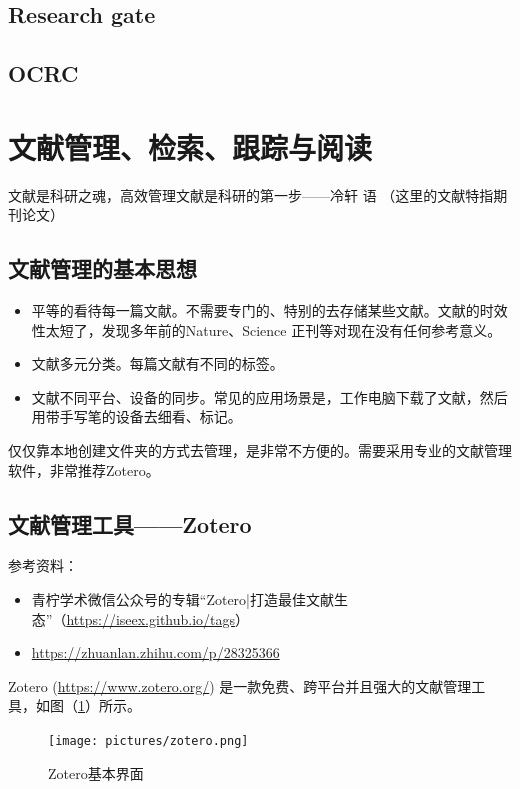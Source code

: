 \subsection{Research gate}


\subsection{OCRC}




\section{文献管理、检索、跟踪与阅读}
文献是科研之魂，高效管理文献是科研的第一步——冷轩 \quad 语 （这里的文献特指期刊论文）



\subsection{文献管理的基本思想}
\begin{itemize}
\item 平等的看待每一篇文献。不需要专门的、特别的去存储某些文献。文献的时效性太短了，发现多年前的Nature、Science 正刊等对现在没有任何参考意义。

\item 文献多元分类。每篇文献有不同的标签。

\item 文献不同平台、设备的同步。常见的应用场景是，工作电脑下载了文献，然后用带手写笔的设备去细看、标记。
\end{itemize}
仅仅靠本地创建文件夹的方式去管理，是非常不方便的。需要采用专业的文献管理软件，非常推荐Zotero。





\subsection{文献管理工具——Zotero}
参考资料：
\begin{itemize}
\item 青柠学术微信公众号的专辑“Zotero|打造最佳文献生态”（\url{https://iseex.github.io/tags}）
\item \url{https://zhuanlan.zhihu.com/p/28325366}
\end{itemize}


Zotero (\url{https://www.zotero.org/}) 是一款免费、跨平台并且强大的文献管理工具，如图（\ref{fig566}）所示。
\begin{figure}[h!]
\centering
\texttt{[image: pictures/zotero.png]}
\caption{Zotero基本界面}
\label{fig566}
\end{figure}





